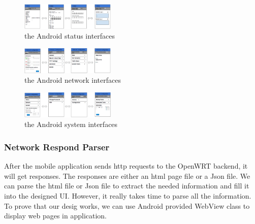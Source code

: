 	\begin{figure}
		\centering
		\includegraphics[width=0.4\textwidth]{UIstatus.png}
		\caption{the Android status interfaces}
		\label{OpenWRT:androidstatus}
	\end{figure}
	
	\begin{figure}
		\centering
		\includegraphics[width=0.4\textwidth]{UInetwork.png}
		\caption{the Android network interfaces}
		\label{OpenWRT:androidnetwork}
	\end{figure}
	\begin{figure}
		\centering
		\includegraphics[width=0.4\textwidth]{UIsystem.png}
		\caption{the Android system interfaces}
		\label{OpenWRT:androidsystem}
	\end{figure}

\subsubsection{Network Respond Parser}
After the mobile application sends http requests to the OpenWRT backend, it will get responses. The responses are either an html page file or a Json file. We can parse the html file or Json file to extract the needed information and fill it into the designed UI. However, it really takes time to parse all the information. To prove that our desig works, we can use Android provided WebView class to display web pages in application.

